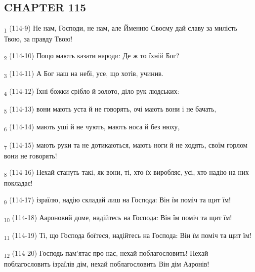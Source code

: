\subsection{CHAPTER 115}
\begin{tcolorbox}
\textsubscript{1} (114-9) Не нам, Господи, не нам, але Йменню Своєму дай славу за милість Твою, за правду Твою!
\end{tcolorbox}
\begin{tcolorbox}
\textsubscript{2} (114-10) Пощо мають казати народи: Де ж то їхній Бог?
\end{tcolorbox}
\begin{tcolorbox}
\textsubscript{3} (114-11) А Бог наш на небі, усе, що хотів, учинив.
\end{tcolorbox}
\begin{tcolorbox}
\textsubscript{4} (114-12) Їхні божки срібло й золото, діло рук людських:
\end{tcolorbox}
\begin{tcolorbox}
\textsubscript{5} (114-13) вони мають уста й не говорять, очі мають вони і не бачать,
\end{tcolorbox}
\begin{tcolorbox}
\textsubscript{6} (114-14) мають уші й не чують, мають носа й без нюху,
\end{tcolorbox}
\begin{tcolorbox}
\textsubscript{7} (114-15) мають руки та не дотикаються, мають ноги й не ходять, своїм горлом вони не говорять!
\end{tcolorbox}
\begin{tcolorbox}
\textsubscript{8} (114-16) Нехай стануть такі, як вони, ті, хто їх виробляє, усі, хто надію на них покладає!
\end{tcolorbox}
\begin{tcolorbox}
\textsubscript{9} (114-17) ізраїлю, надію складай лиш на Господа: Він їм поміч та щит їм!
\end{tcolorbox}
\begin{tcolorbox}
\textsubscript{10} (114-18) Аароновий доме, надійтесь на Господа: Він їм поміч та щит їм!
\end{tcolorbox}
\begin{tcolorbox}
\textsubscript{11} (114-19) Ті, що Господа боїтеся, надійтесь на Господа: Він їм поміч та щит їм!
\end{tcolorbox}
\begin{tcolorbox}
\textsubscript{12} (114-20) Господь пам'ятає про нас, нехай поблагословить! Нехай поблагословить ізраїлів дім, нехай поблагословить Він дім Ааронів!
\end{tcolorbox}
